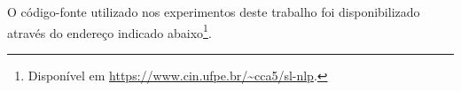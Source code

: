 





O código-fonte utilizado nos experimentos deste trabalho foi disponibilizado através do endereço indicado abaixo\footnote{
    Disponível em \url{https://www.cin.ufpe.br/~cca5/sl-nlp}.
}.







